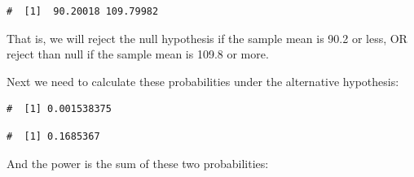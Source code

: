 \documentclass[letterpaper,11pt,twoside,]{pinp}
\begin{document}
\begin{ShadedResult}
\begin{verbatim}
#  [1]  90.20018 109.79982
\end{verbatim}
\end{ShadedResult}

That is, we will reject the null hypothesis if the sample mean is 90.2
or less, OR reject than null if the sample mean is 109.8 or more.

Next we need to calculate these probabilities under the alternative
hypothesis:

\begin{Shaded}
\begin{Highlighting}[]
\OtherTok{\textless{}{-}} \NormalTok{(} \NormalTok{, } \NormalTok{, }  \SpecialCharTok{/} \NormalTok{(}\NormalTok{), } \NormalTok{))}
\end{Highlighting}
\end{Shaded}

\begin{ShadedResult}
\begin{verbatim}
#  [1] 0.001538375
\end{verbatim}
\end{ShadedResult}

\begin{Shaded}
\begin{Highlighting}[]
\OtherTok{\textless{}{-}} \NormalTok{(} \NormalTok{, } \NormalTok{, }  \SpecialCharTok{/} \NormalTok{(}\NormalTok{), } \NormalTok{))}
\end{Highlighting}
\end{Shaded}

\begin{ShadedResult}
\begin{verbatim}
#  [1] 0.1685367
\end{verbatim}
\end{ShadedResult}

And the power is the sum of these two probabilities:
\end{document}
